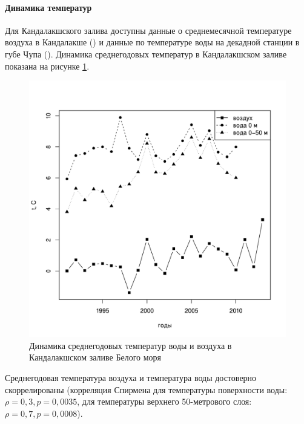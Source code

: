 		\paragraph{Динамика температур}
Для Кандалакшского залива доступны данные о среднемесячной температуре воздуха в Кандалакше (\cite{KGZ_letopis, rp5_Kandalaksha}) и данные по температуре воды на декадной станции в губе Чупа (\cite{Berger_et_al_2003}).  
Динамика среднегодовых температур в Кандалакшском заливе показана на рисунке \ref{ris:White_temp_year_dynamic}.
	\begin{figure}
    \includegraphics[width=\textwidth]{../temperatures_water_air/White_temp_air_water_dynamic1.pdf}
    \caption{Динамика среднегодовых температур воды и воздуха в Кандалакшском заливе Белого моря}
    \label{ris:White_temp_year_dynamic}
	\end{figure}

Среднегодовая температура воздуха и температура воды достоверно скоррелированы (корреляция Спирмена для температуры поверхности воды: $\rho = 0,3, p = 0,0035$, для температуры верхнего 50-метрового слоя: $\rho = 0,7, p = 0,0008$).


